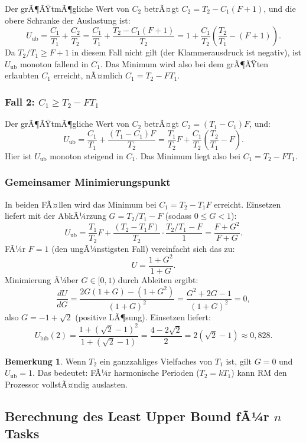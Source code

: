 ﻿\documentclass[a4paper,12pt]{report}
\theoremstyle{definition}
\newtheorem{bemerkung}{Bemerkung}[chapter]
\begin{document}
Der grÃ¶ÃŸtmÃ¶gliche Wert von $C_2$ betrÃ¤gt $C_2 = T_2 - C_1(F+1)$, und die
obere Schranke der Auslastung ist:
\[
	U_{\text{ub}} = \frac{C_1}{T_1} + \frac{C_2}{T_2}
	= \frac{C_1}{T_1} + \frac{T_2 - C_1(F+1)}{T_2}
	= 1 + \frac{C_1}{T_2}\left(\frac{T_2}{T_1} - (F+1)\right).
\]
Da $T_2/T_1 \geq F + 1$ in diesem Fall nicht gilt (der Klammerausdruck ist negativ),
ist $U_{\text{ub}}$ monoton fallend in $C_1$. Das Minimum wird also bei dem grÃ¶ÃŸten
erlaubten $C_1$ erreicht, nÃ¤mlich $C_1 = T_2 - F T_1$.

\subsubsection{Fall 2: $C_1 \geq T_2 - F T_1$}

Der grÃ¶ÃŸtmÃ¶gliche Wert von $C_2$ betrÃ¤gt $C_2 = (T_1 - C_1) F$, und:
\[
	U_{\text{ub}} = \frac{C_1}{T_1} + \frac{(T_1 - C_1)F}{T_2}
	= \frac{T_1}{T_2} F + \frac{C_1}{T_2}\left(\frac{T_2}{T_1} - F\right).
\]
Hier ist $U_{\text{ub}}$ monoton steigend in $C_1$. Das Minimum liegt also bei
$C_1 = T_2 - F T_1$.

\subsubsection{Gemeinsamer Minimierungspunkt}

In beiden FÃ¤llen wird das Minimum bei $C_1 = T_2 - T_1 F$ erreicht. Einsetzen liefert
mit der AbkÃ¼rzung $G = T_2/T_1 - F$ (sodass $0 \leq G < 1$):
\[
	U_{\text{ub}} = \frac{T_1}{T_2}F + \frac{(T_2 - T_1 F)}{T_2}
	\cdot\frac{T_2/T_1 - F}{1}
	= \frac{F + G^2}{F + G}.
\]
FÃ¼r $F = 1$ (den ungÃ¼nstigsten Fall) vereinfacht sich das zu:
\[
	U = \frac{1 + G^2}{1 + G}.
\]
Minimierung Ã¼ber $G \in [0,1)$ durch Ableiten ergibt:
\[
	\frac{dU}{dG} = \frac{2G(1+G) - (1+G^2)}{(1+G)^2} = \frac{G^2 + 2G - 1}{(1+G)^2} = 0,
\]
also $G = -1 + \sqrt{2}$ (positive LÃ¶sung). Einsetzen liefert:
\[
	U_{\text{lub}}(2) = \frac{1 + (\sqrt{2}-1)^2}{1 + (\sqrt{2}-1)}
	= \frac{4 - 2\sqrt{2}}{2} = 2(\sqrt{2} - 1) \approx 0{,}828.
\]

\begin{bemerkung}
	Wenn $T_2$ ein ganzzahliges Vielfaches von $T_1$ ist, gilt $G = 0$ und
	$U_{\text{ub}} = 1$. Das bedeutet: FÃ¼r harmonische Perioden ($T_2 = k T_1$)
	kann RM den Prozessor vollstÃ¤ndig auslasten.
\end{bemerkung}

\subsection{Berechnung des Least Upper Bound fÃ¼r $n$ Tasks}
\end{document}
